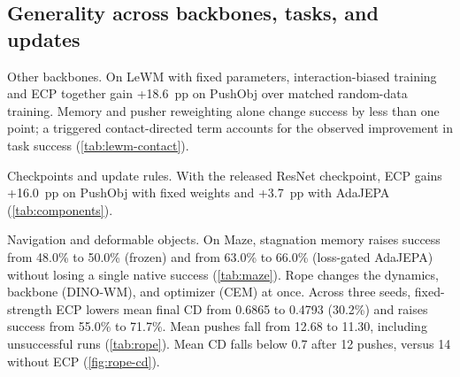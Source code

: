 \subsection{Generality across backbones, tasks, and updates}
\label{sec:generality}
\par\smallskip\noindent Other backbones.
On LeWM with fixed parameters, interaction-biased training and ECP together gain +18.6~pp on PushObj over matched random-data training. Memory and pusher reweighting alone change success by less than one point; a triggered contact-directed term accounts for the observed improvement in task success (\cref{tab:lewm-contact}).

\par\smallskip\noindent Checkpoints and update rules.
With the released ResNet checkpoint, ECP gains +16.0~pp on PushObj with fixed weights and +3.7~pp with AdaJEPA (\cref{tab:components}).

\par\smallskip\noindent Navigation and deformable objects.
On Maze, stagnation memory raises success from 48.0\% to 50.0\% (frozen) and from 63.0\% to 66.0\% (loss-gated AdaJEPA) without losing a single native success (\cref{tab:maze}). Rope changes the dynamics, backbone (DINO-WM), and optimizer (CEM) at once. Across three seeds, fixed-strength ECP lowers mean final CD from 0.6865 to 0.4793 (30.2\%) and raises success from 55.0\% to 71.7\%. Mean pushes fall from 12.68 to 11.30, including unsuccessful runs (\cref{tab:rope}). Mean CD falls below 0.7 after 12 pushes, versus 14 without ECP (\cref{fig:rope-cd}).
